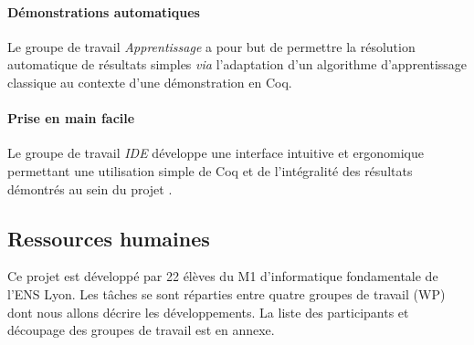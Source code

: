 \paragraph{Démonstrations automatiques} Le groupe de travail \emph{Apprentissage} a pour but de permettre la résolution automatique de résultats simples \emph{via} l'adaptation d'un algorithme d'apprentissage classique au contexte d'une démonstration en Coq.

\paragraph{Prise en main facile} Le groupe de travail \emph{IDE} développe une interface intuitive et ergonomique permettant une utilisation simple de Coq et de l'intégralité des résultats démontrés au sein du projet \coquille{}.

\subsection{Ressources humaines}

Ce projet est développé par 22 élèves du M1 d'informatique fondamentale de l'ENS Lyon. Les tâches se sont réparties entre quatre groupes de travail (WP) dont nous allons décrire les développements. La liste des participants et découpage des groupes de travail est en annexe.
